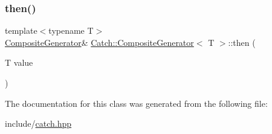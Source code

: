 \mbox{\label{class_catch_1_1_composite_generator_aefdc11bcfccdf07d2db5f0da3ed8758c}} 
\subsubsection{\texorpdfstring{then()}{then()}\hspace{0.1cm}{\footnotesize\ttfamily [2/2]}}
{\footnotesize\ttfamily template$<$typename T$>$ \\
\mbox{\hyperlink{class_catch_1_1_composite_generator}{Composite\+Generator}}\& \mbox{\hyperlink{class_catch_1_1_composite_generator}{Catch\+::\+Composite\+Generator}}$<$ T $>$\+::then (\begin{DoxyParamCaption}\item[{T}]{value }\end{DoxyParamCaption})\hspace{0.3cm}{\ttfamily [inline]}}



The documentation for this class was generated from the following file\+:\begin{DoxyCompactItemize}
\item 
include/\mbox{\hyperlink{catch_8hpp}{catch.\+hpp}}\end{DoxyCompactItemize}
